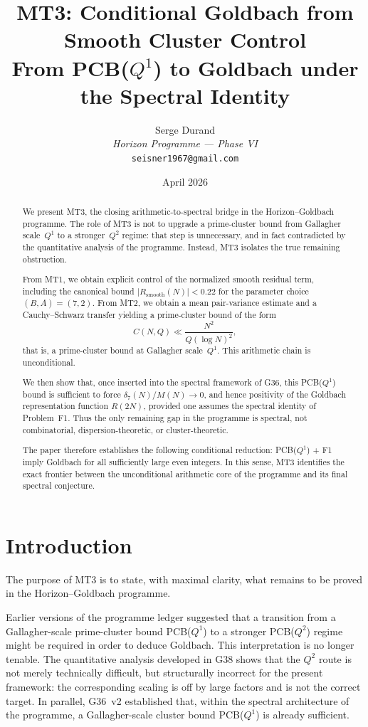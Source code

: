 \documentclass[11pt,a4paper]{article}
\title{\textbf{MT3: Conditional Goldbach from Smooth Cluster Control}\\[6pt]
\large From PCB($Q^1$) to Goldbach under the Spectral Identity}
\author{Serge Durand\\
\textit{Horizon Programme --- Phase VI}\\
\texttt{seisner1967@gmail.com}}
\date{April 2026}
\begin{document}
\maketitle

\begin{abstract}
We present MT3, the closing arithmetic-to-spectral bridge in the Horizon--Goldbach programme. The role of MT3 is not to upgrade a prime-cluster bound from Gallagher scale~$Q^1$ to a stronger~$Q^2$ regime: that step is unnecessary, and in fact contradicted by the quantitative analysis of the programme. Instead, MT3 isolates the true remaining obstruction.

From MT1, we obtain explicit control of the normalized smooth residual term, including the canonical bound $|R_{\mathrm{smooth}}(N)| < 0.22$ for the parameter choice $(B,A) = (7,2)$. From MT2, we obtain a mean pair-variance estimate and a Cauchy--Schwarz transfer yielding a prime-cluster bound of the form
\[
C(N,Q) \ll \frac{N^2}{Q(\log N)^2},
\]
that is, a prime-cluster bound at Gallagher scale~$Q^1$. This arithmetic chain is unconditional.

We then show that, once inserted into the spectral framework of G36, this PCB($Q^1$) bound is sufficient to force $\delta_7(N)/M(N) \to 0$, and hence positivity of the Goldbach representation function $R(2N)$, provided one assumes the spectral identity of Problem~F1. Thus the only remaining gap in the programme is spectral, not combinatorial, dispersion-theoretic, or cluster-theoretic.

The paper therefore establishes the following conditional reduction: PCB($Q^1$) + F1 imply Goldbach for all sufficiently large even integers. In this sense, MT3 identifies the exact frontier between the unconditional arithmetic core of the programme and its final spectral conjecture.
\end{abstract}

\section{Introduction}

The purpose of MT3 is to state, with maximal clarity, what remains to be proved in the Horizon--Goldbach programme.

Earlier versions of the programme ledger suggested that a transition from a Gallagher-scale prime-cluster bound PCB($Q^1$) to a stronger PCB($Q^2$) regime might be required in order to deduce Goldbach. This interpretation is no longer tenable. The quantitative analysis developed in G38 shows that the $Q^2$ route is not merely technically difficult, but structurally incorrect for the present framework: the corresponding scaling is off by large factors and is not the correct target. In parallel, G36~v2 established that, within the spectral architecture of the programme, a Gallagher-scale cluster bound PCB($Q^1$) is already sufficient.
\end{document}
